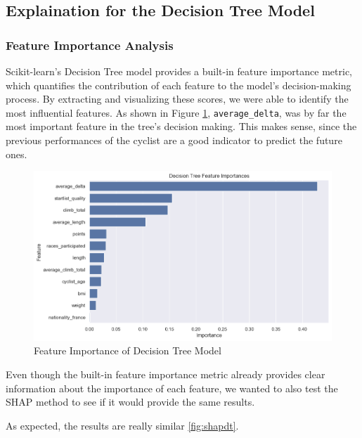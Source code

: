 \documentclass{article}
\begin{document}
\subsection{Explaination for the Decision Tree Model}


\subsubsection{Feature Importance Analysis}

Scikit-learn’s Decision Tree model provides a built-in feature importance metric, which quantifies the contribution of each feature to the model’s decision-making process. By extracting and visualizing these scores, we were able to identify the most influential features. As shown in Figure \ref{fig:decision_tree_importance}, \texttt{average\_delta}, was by far the most important feature in the tree's decision making. This makes sense, since the previous performances of the cyclist are a good indicator to predict the future ones.

\begin{figure}[H]
\centering
\includegraphics[width=0.9\linewidth]{builtin-dt.png}
\caption{Feature Importance of Decision Tree Model}
\label{fig:decision_tree_importance}
\end{figure}

Even though the built-in feature importance metric already provides clear information about the importance of each feature, we wanted to also test the SHAP method to see if it would provide the same results.

As expected, the results are really similar \ref{fig:shapdt}.
\end{document}

